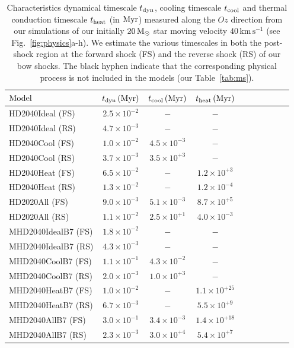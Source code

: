 \documentclass[useAMS,usenatbib]{mn2e}
\begin{document}
\begin{table}
	\centering
	\caption{
	Characteristics dynamical timescale $t_{\rm dyn}$, cooling timescale $t_{\rm cool}$ and thermal
conduction timescale $t_{\rm heat}$ (in $\rm Myr$) measured along the $Oz$ direction from our simulations
of our initially $20\, \rm M_{\odot}$ star moving velocity $40\, \mathrm{km}\,
\mathrm{s}^{-1}$ (see Fig.~\ref{fig:physics}a-h). We estimate the various
timescales in both the post-shock region at the forward shock (FS) and the
reverse shock (RS) of our bow shocks. The black hyphen indicate that the
corresponding physical process is not included in the models (our
Table~\ref{tab:ms}).  
	}
	\begin{tabular}{lccccccccc}
	\hline
	${\rm {Model}}$ &   $t_{\rm dyn}\, (\rm Myr)$                              
 			 &   $t_{\rm cool}\, (\rm Myr)$
			 &   $t_{\rm heat}\, (\rm Myr)$ 
			\\ \hline     
	HD2040Ideal (FS)     &  $2.5\times 10^{-2}$  &  $-$  &  $-$    \\             
	HD2040Ideal (RS)     &  $4.7\times 10^{-3}$  &  $-$  &  $-$    \\             
	HD2040Cool (FS)      &  $1.0\times 10^{-2}$  &  $4.5\times 10^{-3}$  &  $-$    \\        
	HD2040Cool (RS)      &  $3.7\times 10^{-3}$  &  $3.5\times 10^{+3}$  &  $-$    \\        
	HD2040Heat (FS)      &  $6.5\times 10^{-2}$  &  $-$                  &  $1.2\times 10^{+3}$    \\ 
	HD2040Heat (RS)      &  $1.3\times 10^{-2}$  &  $-$                  &  $1.2\times 10^{-4}$    \\ 
	HD2020All (FS)       &  $9.0\times 10^{-3}$  &  $5.1\times 10^{-3}$  &  $8.7\times 10^{+5}$    \\             
	HD2020All (RS)       &  $1.1\times 10^{-2}$  &  $2.5\times 10^{+1}$  &  $4.0\times 10^{-3}$    \\             
	MHD2040IdealB7 (FS)  &  $1.8\times 10^{-2}$  &  $-$  		       &  $-$    \\        
	MHD2040IdealB7 (RS)  &  $4.3\times 10^{-3}$  &  $-$                  &  $-$    \\        
	MHD2040CoolB7 (FS)   &  $1.1\times 10^{-1}$  &  $4.3\times 10^{-2}$  &  $-$    \\ 
	MHD2040CoolB7 (RS)   &  $2.0\times 10^{-3}$  &  $1.0\times 10^{+3}$  &  $-$    \\  	
	MHD2040HeatB7 (FS)   &  $1.0\times 10^{-2}$  &  $-$                  &  $1.1\times 10^{+25}$    \\         
	MHD2040HeatB7 (RS)   &  $6.7\times 10^{-3}$  &  $-$                  &  $5.5\times 10^{+9}$    \\         
	MHD2040AllB7 (FS)    &  $3.0\times 10^{-1}$  &  $3.4\times 10^{-3}$  &  $1.4\times 10^{+18}$    \\   
	MHD2040AllB7 (RS)    &  $2.3\times 10^{-3}$  &  $3.0\times 10^{+4}$  &  $5.4\times 10^{+7}$    \\ 	
	\hline    
	\end{tabular}
\label{tab:ts}
\end{table}
\end{document}
